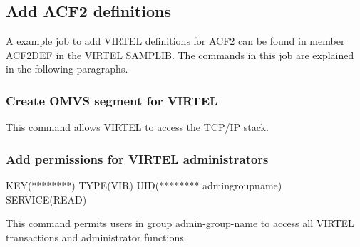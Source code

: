 \documentclass[letterpaper,10pt,english]{sphinxmanual}
\begin{document}
\subsection{Add ACF2 definitions}
\label{\detokenize{Installation_Guide:add-acf2-definitions}}
A example job to add VIRTEL definitions for ACF2 can be found in member ACF2DEF in the VIRTEL SAMPLIB. The commands in this job are explained in the following paragraphs.


\subsubsection{Create OMVS segment for VIRTEL}
\label{\detokenize{Installation_Guide:create-omvs-segment-for-virtel}}
\begin{sphinxVerbatim}[commandchars=\\\{\}]
  
    
\end{sphinxVerbatim}


This command allows VIRTEL to access the TCP/IP stack.


\subsubsection{Add permissions for VIRTEL administrators}
\label{\detokenize{Installation_Guide:add-permissions-for-virtel-administrators}}
\begin{sphinxVerbatim}[commandchars=\\\{\}]
\PYGZdl{}KEY(********) TYPE(VIR) UID(******** admin\PYGZhy{}group\PYGZhy{}name) SERVICE(READ)
\end{sphinxVerbatim}


This command permits users in group admin-group-name to access all VIRTEL transactions and administrator functions.

\end{document}
